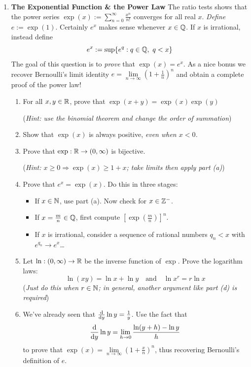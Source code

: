 \begin{exercises}{}
\begin{enumerate}
   	\item\label{exs:expmasochist} \textbf{The Exponential Function \& the Power Law}\smallbreak
    	The ratio tests shows that the power series $\exp(x):=\sum_{n=0}^\infty\frac{x^n}{n!}$ converges for all real $x$. 
		\emph{Define} $e:=\exp(1)$. Certainly $e^x$ makes sense whenever $x\in\mathbb{Q}$. If $x$ is irrational, instead define
	  \[
	  	e^x:=\sup\{e^q:q\in\mathbb{Q},\ q< x\}
	  \]
		The goal of this question is to \emph{prove} that $\exp(x)=e^x$. As a nice bonus we recover Bernoulli's limit identity $e=\lim\limits_{n\to\infty}\left(1+\frac 1n\right)^n$ and obtain a complete proof of the power law!
	  \begin{enumerate}
	    \item For all $x,y\in\mathbb{R}$, prove that $\exp(x+y)=\exp(x)\exp(y)$\par
	    (\emph{Hint: use the binomial theorem and change the order of summation})
	    
	    \item Show that $\exp(x)$ is always positive, \emph{even when $x<0$.}
	    
	    \item Prove that $\exp:\mathbb{R}\to (0,\infty)$ is bijective.\par
	    (\emph{Hint: $x\ge 0\Longrightarrow \exp(x)\ge 1+x$; take limits then apply part (a)})
	    
	    \item Prove that $e^x=\exp(x)$. Do this in three stages:
	    \begin{itemize}
	      \item If $x\in\mathbb{N}$, use part (a). Now check for $x\in\mathbb{Z}^-$.
	      \item If $x=\frac mn\in\mathbb{Q}$, first compute $\left[\exp(\frac mn)\right]^n$.
	      \item If $x$ is irrational, consider a sequence of rational numbers $q_n<x$ with $e^{q_n}\to e^x$\ldots
	    \end{itemize}
	
	    \item Let $\ln:(0,\infty)\to\mathbb{R}$ be the inverse function of $\exp$. Prove the logarithm laws:
	    \[
	    	\ln(xy)=\ln x+\ln y
	    	\quad\text{and}\quad 
	    	\ln x^r=r\ln x
	    \]
	    (\emph{Just do this when $r\in\mathbb{N}$; in general, another argument like part (d) is required})
	    
	    \item We've already seen that $\frac{\mathrm{d} }{\mathrm{d} y}\ln y=\frac 1y$. Use the fact that
	    \[
	    	\frac{\mathrm{d} }{\mathrm{d} y}\ln y=\lim_{h\to 0}\frac{\ln(y+h)-\ln y}h
	    \]
	    to prove that $\exp(x)=\lim\limits_{n\to\infty}\left(1+\frac xn\right)^n$, thus recovering Bernoulli's definition of $e$.
	    

\end{enumerate}
\end{enumerate}
\end{exercises}

